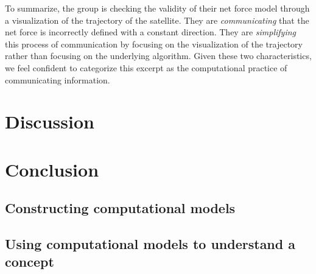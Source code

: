 \documentclass{msuphddissertation}
\begin{document}
\begin{doublespace}
To summarize, the group is checking the validity of their net force model through a visualization of the trajectory of the satellite.  They are \textit{communicating} that the net force is incorrectly defined with a constant direction.  They are \textit{simplifying} this process of communication by focusing on the visualization of the trajectory rather than focusing on the underlying algorithm.  Given these two characteristics, we feel confident to categorize this excerpt as the computational practice of communicating information.

%
%

\chapter{Discussion}\label{CH6:Discussion}


%
%

\chapter{Conclusion}\label{CH7:Conclusion}

%
%

\appendices\label{Appendix}

\section*{Constructing computational models}

\section*{Using computational models to understand a concept}

%
%

\end{doublespace}



\end{document}
